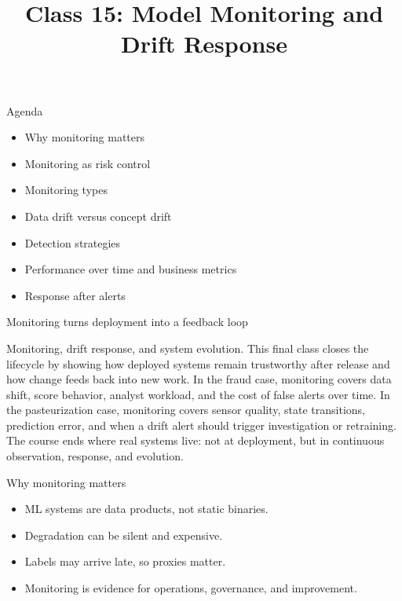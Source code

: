 

\title{Class 15: Model Monitoring and Drift Response}
\author{\coursename}
\date{}



\frame{\titlepage \coursefooter}

\begin{frame}{Agenda}
\begin{itemize}
\item Why monitoring matters
\item Monitoring as risk control
\item Monitoring types
\item Data drift versus concept drift
\item Detection strategies
\item Performance over time and business metrics
\item Response after alerts
\end{itemize}
\coursefooter
\end{frame}

\begin{frame}{Monitoring turns deployment into a feedback loop}
\coursefooter
\end{frame}

\coursecontextframe
{Monitoring, drift response, and system evolution.}
{This final class closes the lifecycle by showing how deployed systems remain trustworthy after release and how change feeds back into new work.}
{In the fraud case, monitoring covers data shift, score behavior, analyst workload, and the cost of false alerts over time.}
{In the pasteurization case, monitoring covers sensor quality, state transitions, prediction error, and when a drift alert should trigger investigation or retraining.}
{The course ends where real systems live: not at deployment, but in continuous observation, response, and evolution.}

\begin{frame}{Why monitoring matters}
\begin{itemize}
\item ML systems are data products, not static binaries.
\item Degradation can be silent and expensive.
\item Labels may arrive late, so proxies matter.
\item Monitoring is evidence for operations, governance, and improvement.
\end{itemize}
\coursefooter
\end{frame}

